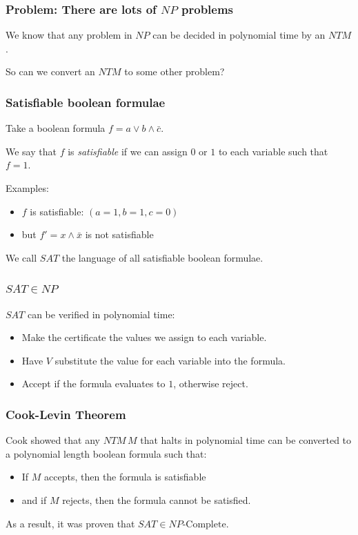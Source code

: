 \documentclass[aspectratio=169]{beamer}
\begin{document}
\begin{frame}
\frametitle{Problem: There are lots of $NP$ problems}
We know that any problem in $NP$ can be decided in polynomial time by an $NTM$.

So can we convert an $NTM$ to some other problem?
\end{frame}

\begin{frame}
\frametitle{Satisfiable boolean formulae}
Take a boolean formula $f = a \vee b \wedge \bar{c}$.

We say that $f$ is {\em satisfiable} if we can assign $0$ or $1$ to each variable such that $f = 1$.

Examples:
\begin{itemize}
    \item $f$ is satisfiable: $(a = 1, b = 1, c = 0)$
    \item but $f' = x \wedge \bar{x}$ is not satisfiable
\end{itemize}

We call $SAT$ the language of all satisfiable boolean formulae.
\end{frame}

\begin{frame}
\frametitle{$SAT \in NP$}
$SAT$ can be verified in polynomial time:

\begin{itemize}
    \item Make the certificate the values we assign to each variable.
    \item Have $V$ substitute the value for each variable into the formula.
    \item Accept if the formula evaluates to $1$, otherwise reject.
\end{itemize}
\end{frame}

\begin{frame}
\frametitle{Cook-Levin Theorem}
Cook showed that any $NTM\, M$ that halts in polynomial time can be converted to a polynomial length boolean formula such that:

\begin{itemize}
    \item If $M$ accepts, then the formula is satisfiable
    \item and if $M$ rejects, then the formula cannot be satisfied.
\end{itemize}

As a result, it was proven that $SAT \in NP\text{-Complete}$.
\end{frame}
\end{document}
